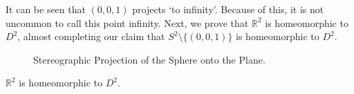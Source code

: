 \documentclass[crop=false,class=book,oneside]{standalone}                      %
\begin{document}
            It can be seen that $(0,0,1)$ projects `to infinity'. Because of
            this, it is not uncommon to call this point infinity. Next, we
            prove that $\mathbb{R}^{2}$ is homeomorphic to $D^{2}$, almost
            completing our claim that $S^{2}\setminus\{(0,0,1)\}$
            is homeomorphic to $D^{2}$.
            \begin{figure}[H]
                \captionsetup{type=figure}
                \centering
                
                \caption{Stereographic Projection of the Sphere onto the Plane.}
                \label{fig:stereographic_projection}
            \end{figure}
            \begin{theorem}
                $\mathbb{R}^{2}$ is homeomorphic to $D^{2}$.
            \end{theorem}
\end{document}
